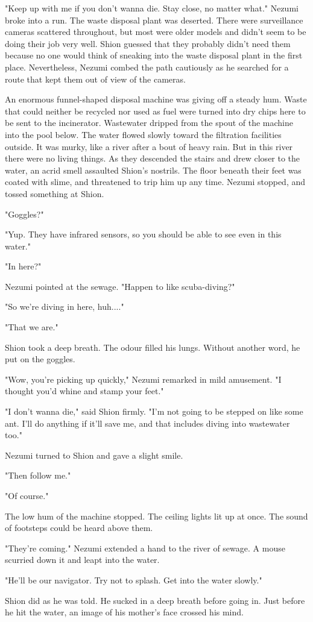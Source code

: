 "Keep up with me if you don't wanna die. Stay close, no matter what."
Nezumi broke into a run. The waste disposal plant was deserted. There
were surveillance cameras scattered throughout, but most were older
models and didn't seem to be doing their job very well. Shion guessed
that they probably didn't need them because no one would think of
sneaking into the waste disposal plant in the first place. Nevertheless,
Nezumi combed the path cautiously as he searched for a route that kept
them out of view of the cameras.

An enormous funnel-shaped disposal machine was giving off a steady hum.
Waste that could neither be recycled nor used as fuel were turned into
dry chips here to be sent to the incinerator. Wastewater dripped from
the spout of the machine into the pool below. The water flowed slowly
toward the filtration facilities outside. It was murky, like a river
after a bout of heavy rain. But in this river there were no living
things. As they descended the stairs and drew closer to the water, an
acrid smell assaulted Shion's nostrils. The floor beneath their feet was
coated with slime, and threatened to trip him up any time. Nezumi
stopped, and tossed something at Shion.

"Goggles?"

"Yup. They have infrared sensors, so you should be able to see even in
this water."

"In here?"

Nezumi pointed at the sewage. "Happen to like scuba-diving?"

"So we're diving in here, huh...."

"That we are."

Shion took a deep breath. The odour filled his lungs. Without another
word, he put on the goggles.

"Wow, you're picking up quickly," Nezumi remarked in mild amusement. "I
thought you'd whine and stamp your feet."

"I don't wanna die," said Shion firmly. "I'm not going to be stepped on
like some ant. I'll do anything if it'll save me, and that includes
diving into wastewater too."

Nezumi turned to Shion and gave a slight smile.

"Then follow me."

"Of course."

The low hum of the machine stopped. The ceiling lights lit up at once.
The sound of footsteps could be heard above them.

"They're coming." Nezumi extended a hand to the river of sewage. A mouse
scurried down it and leapt into the water.

"He'll be our navigator. Try not to splash. Get into the water slowly."

Shion did as he was told. He sucked in a deep breath before going in.
Just before he hit the water, an image of his mother's face crossed his
mind.